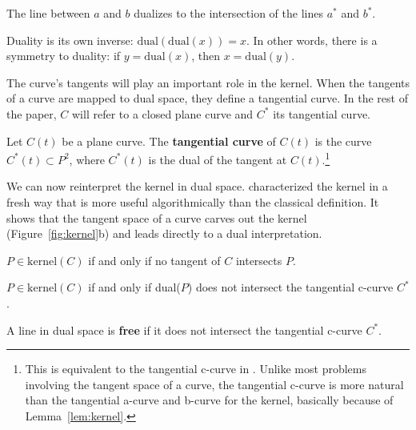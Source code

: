 \documentclass[12pt]{article}
\begin{document}
\begin{lemma}
\label{lem:join}
The line between $a$ and $b$
dualizes to the intersection of the lines $a^*$ and $b^*$.
\end{lemma}

\begin{lemma}
Duality is its own inverse:
$\mbox{dual}(\mbox{dual}(x)) = x$.
In other words, there is a symmetry to duality:
if $y = \mbox{dual}(x)$, then $x = \mbox{dual}(y)$.
\end{lemma}


The curve's tangents will play an important role in the kernel.
When the tangents of a curve are mapped to dual space,
they define a tangential curve.
In the rest of the paper,
$C$ will refer to a closed plane curve and $C^*$ its tangential curve.

\begin{defn2}
\label{defn:tangentialcurve}
Let $C(t)$ be a plane curve.
The {\bf tangential curve} of $C(t)$ is the curve $C^*(t) \subset P^2$,
where $C^*(t)$ is the dual of the tangent at $C(t)$.\footnote{This is
	equivalent to the tangential c-curve in \cite{jj02}.
	Unlike most problems involving the tangent space of a curve,
	the tangential c-curve is more natural than
	the tangential a-curve and b-curve for the kernel,
	basically because of Lemma~\ref{lem:kernel}.}
\end{defn2}


We can now reinterpret the kernel in dual space.
\cite{elber02} characterized the kernel in a fresh way that is more
useful algorithmically than the classical definition.
It shows that the tangent space 
of a curve carves out the kernel (Figure~\ref{fig:kernel}b)
and leads directly to a dual interpretation.

\begin{lemma}[Elber]
\label{lem:kernel}
$P \in \mbox{kernel}(C)$ if and only if no tangent of $C$ intersects $P$.
\end{lemma}

\begin{corollary}
$P \in \mbox{kernel}(C)$ if and only if dual($P$) does not intersect the 
tangential c-curve $C^*$.
\end{corollary}

\begin{defn2}
A line in dual space is {\bf free} if it does not intersect the 
tangential c-curve $C^*$.
\end{defn2}
\end{document}
